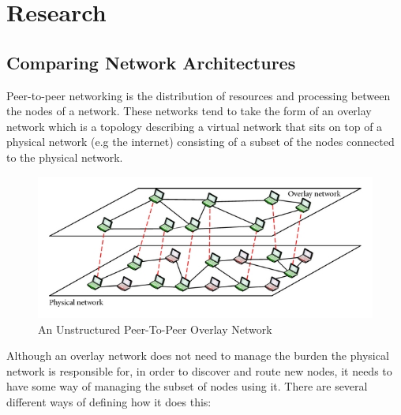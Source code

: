 \documentclass[]{report}
\begin{document}
\chapter{Research}
\section{Comparing Network Architectures}	
	Peer-to-peer networking is the distribution of resources and processing between the nodes of a network. These networks tend to take the form of an overlay network which is a topology describing a virtual network that sits on top of a physical network (e.g the internet) consisting of a subset of the nodes connected to the physical network.
	
	\begin{figure}[H]
		\caption{
			An Unstructured Peer-To-Peer Overlay Network 	
			\cite{Unstructured P2P Diagram}
		}
		\centering
		\includegraphics{overlaynetwork.jpg}
	\end{figure}
	
	Although an overlay network does not need to manage the burden the physical network is responsible for, in order to discover and route new nodes, it needs to have some way of managing the subset of nodes using it. There are several different ways of defining how it does this:
	
\end{document}
